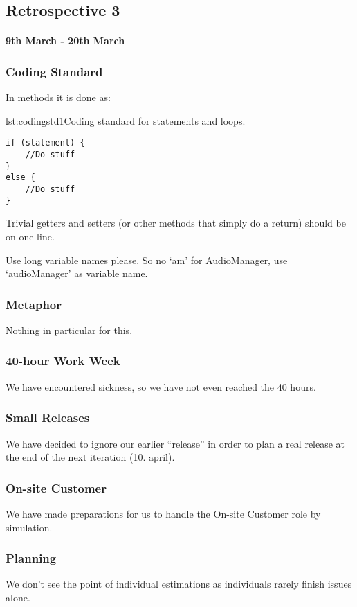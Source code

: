 \subsection*{Retrospective 3}
\paragraph{9th March - 20th March}

\subsubsection{Coding Standard}
In methods it is done as:

\begin{code}{lst:codingstd1}{Coding standard for statements and loops.}
\begin{lstlisting}
if (statement) {
    //Do stuff
}
else {
    //Do stuff
}
\end{lstlisting}
\end{code}


Trivial getters and setters (or other methods that simply do a return) should be on one line.

Use long variable names please. So no ‘am' for AudioManager, use ‘audioManager' as variable name.

\subsubsection{Metaphor}
Nothing in particular for this.

\subsubsection{40-hour Work Week}
We have encountered sickness, so we have not even reached the 40 hours.

\subsubsection{Small Releases}
We have decided to ignore our earlier “release” in order to plan a real release at the end of the next iteration (10. april).


\subsubsection{On-site Customer}
We have made preparations for us to handle the On-site Customer role by simulation.

\subsubsection{Planning}
We don’t see the point of individual estimations as individuals rarely finish issues alone.

